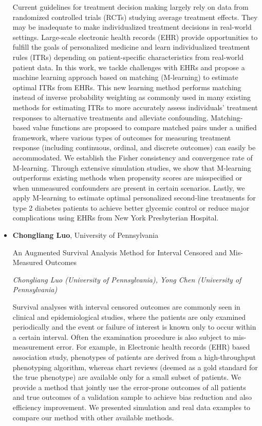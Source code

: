 \begin{itemize}
Current guidelines for treatment decision making largely rely on data from randomized controlled trials (RCTs) studying average treatment effects. They may be inadequate to make individualized treatment decisions in real-world settings. Large-scale electronic health records (EHR) provide opportunities to fulfill the goals of personalized medicine and learn individualized treatment rules (ITRs) depending on patient-specific characteristics from real-world patient data. In this work, we tackle challenges with EHRs and propose a machine learning approach based on matching (M-learning) to estimate optimal ITRs from EHRs. This new learning method performs matching instead of inverse probability weighting as commonly used in many existing methods for estimating ITRs to more accurately assess individuals' treatment responses to alternative treatments and alleviate confounding. Matching-based value functions are proposed to compare matched pairs under a unified framework, where various types of outcomes for measuring treatment response (including continuous, ordinal, and discrete outcomes) can easily be accommodated. We establish the Fisher consistency and convergence rate of M-learning. Through extensive simulation studies, we show that M-learning outperforms existing methods when propensity scores are misspecified or when unmeasured confounders are present in certain scenarios. Lastly, we apply M-learning to estimate optimal personalized second-line treatments for type 2 diabetes patients to achieve better glycemic control or reduce major complications using EHRs from New York Presbyterian Hospital.

\item \textbf{Chongliang Luo}, University of Pennsylvania

An Augmented Survival Analysis Method for Interval Censored and Mis-Measured Outcomes

\emph{\footnotesize Chongliang Luo (University of Pennsylvania), Yong Chen (University of Pennsylvania)}

Survival analyses with interval censored outcomes are commonly seen in clinical and epidemiological studies, where the patients are only examined periodically and the event or failure of interest is known only to occur within a certain interval. Often the examination procedure is also subject to mis-measurement error. For example, in Electronic health records (EHR) based association study, phenotypes of patients are derived from a high-throughput phenotyping algorithm, whereas chart reviews (deemed as a gold standard for the true phenotype) are available only for a small subset of patients. We provide a method that jointly use the error-prone outcomes of all patients and true outcomes of a validation sample to achieve bias reduction and also efficiency improvement. We presented simulation and real data examples to compare our method with other available methods.


\end{itemize}

